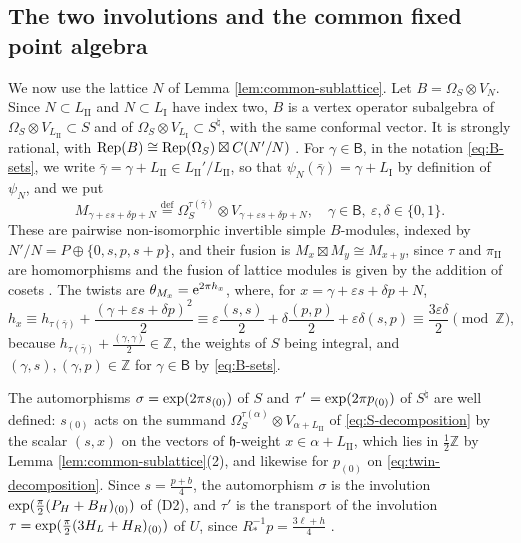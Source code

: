 \documentclass[leqno]{article}
\let\cal\relax
\newcommand{\cal}{\mathcal}
\newcommand{\Z}{\ensuremath{\mathbb{Z}}}
\newcommand{\ot}{\otimes}
\let\i\relax
\newcommand{\i}{\mathrm{i}}
\newcommand{\ov}{\overset}
\newcommand{\epsi}{\varepsilon}
\newcommand{\e}{\mathrm{e}}
\DeclareMathOperator{\Rep}{Rep}
\numberwithin{equation}{section}
\begin{document}
\subsection{The two involutions and the common fixed point algebra}
\label{subsec:involutions}

We now use the lattice $N$ of Lemma \ref{lem:common-sublattice}. Let $B = \Omega_S \ot V_N$. Since $N \subset L_{\mathrm{II}}$ and $N \subset L_{\mathrm I}$ have index two, $B$ is a vertex operator subalgebra of $\Omega_S \ot V_{L_{\mathrm{II}}} \subset S$ and of $\Omega_S \ot V_{L_{\mathrm I}} \subset S^\natural$, with the same conformal vector. It is strongly rational, with $\Rep(B) \cong \Rep(\Omega_S) \boxtimes \cal C(N'/N)$ \cite{FHL93,CKM22}. For $\gamma \in \mathsf B$, in the notation \eqref{eq:B-sets}, we write $\bar\gamma = \gamma+L_{\mathrm{II}} \in L_{\mathrm{II}}'/L_{\mathrm{II}}$, so that $\psi_N(\bar\gamma) = \gamma+L_{\mathrm I}$ by definition of $\psi_N$, and we put
\begin{equation}
\label{eq:M-summands}
M_{\gamma+\epsi s+\delta p+N} \ov{\mathrm{def}}{=} \Omega_S^{\tau(\bar\gamma)} \ot V_{\gamma+\epsi s+\delta p+N},
\quad
\gamma \in \mathsf B,\ \epsi,\delta \in \{0,1\}.
\end{equation}
These are pairwise non-isomorphic invertible simple $B$-modules, indexed by $N'/N = P \oplus \{0,s,p,s+p\}$, and their fusion is $M_x \boxtimes M_y \cong M_{x+y}$, since $\tau$ and $\pi_{\mathrm{II}}$ are homomorphisms and the fusion of lattice modules is given by the addition of cosets \cite{DL93}. The twists are $\theta_{M_x} = \e^{2\pi\i h_x}$, where, for $x = \gamma+\epsi s+\delta p+N$,
\begin{equation}
\label{eq:M-weights}
h_x \equiv h_{\tau(\bar\gamma)}+\frac{(\gamma+\epsi s+\delta p)^2}2 \equiv \epsi\frac{(s,s)}2+\delta\frac{(p,p)}2+\epsi\delta(s,p) \equiv \frac{3\epsi\delta}2 \pmod{\Z},
\end{equation}
because $h_{\tau(\bar\gamma)}+\frac{(\gamma,\gamma)}2 \in \Z$, the weights of $S$ being integral, and $(\gamma,s), (\gamma,p) \in \Z$ for $\gamma \in \mathsf B$ by \eqref{eq:B-sets}.

The automorphisms $\sigma = \exp(2\pi\i s_{(0)})$ of $S$ and $\tau' = \exp(2\pi\i p_{(0)})$ of $S^\natural$ are well defined: $s_{(0)}$ acts on the summand $\Omega_S^{\tau(\alpha)} \ot V_{\alpha+L_{\mathrm{II}}}$ of \eqref{eq:S-decomposition} by the scalar $(s,x)$ on the vectors of $\mathfrak h$-weight $x \in \alpha+L_{\mathrm{II}}$, which lies in $\frac12\Z$ by Lemma \ref{lem:common-sublattice}(2), and likewise for $p_{(0)}$ on \eqref{eq:twin-decomposition}. Since $s = \frac{p+b}4$, the automorphism $\sigma$ is the involution $\exp(\frac{\pi\i}2(P_H+B_H)_{(0)})$ of \textup{(D2)}, and $\tau'$ is the transport of the involution $\tau = \exp(\frac{\pi\i}2(3H_L+H_R)_{(0)})$ of $U$, since $R_*^{-1}p = \frac{3\ell+h}4$ \cite[Section 5]{DJX26}.
\end{document}

